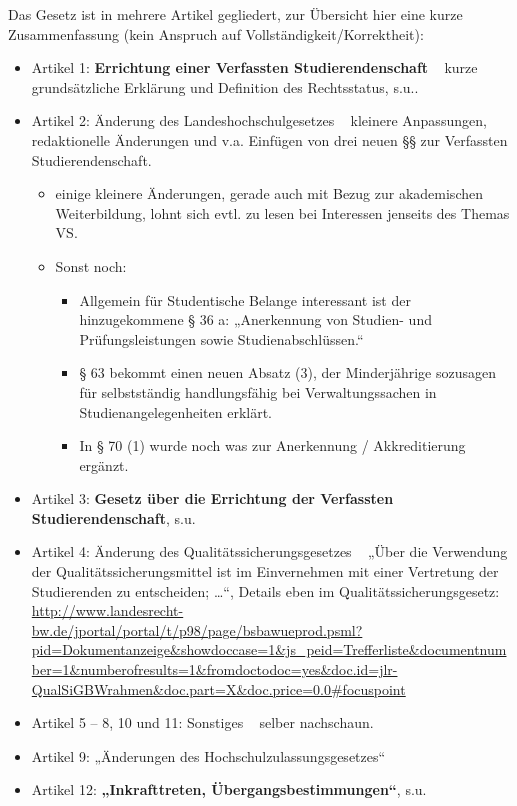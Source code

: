 \documentclass[
10pt,
a4paper,
twoside,								%
titlepage=false,							%
draft=false								%
]{scrartcl}
\begin{document}
Das Gesetz ist in mehrere Artikel gegliedert, zur Übersicht hier eine kurze Zusammenfassung (kein Anspruch auf Vollständigkeit/Korrektheit):

\begin{itemize}
	\item Artikel 1: \textbf{Errichtung einer Verfassten Studierendenschaft} \textrightarrow~ kurze grundsätzliche Erklärung und Definition des Rechtsstatus, s.u..
	\item Artikel 2: Änderung des Landeshochschulgesetzes \textrightarrow~ kleinere Anpassungen, redaktionelle Änderungen und v.a. Einfügen von drei neuen §§ zur Verfassten Studierendenschaft.
	\begin{itemize}
		\item einige kleinere Änderungen, gerade auch mit Bezug zur akademischen Weiterbildung, lohnt sich evtl. zu lesen bei Interessen jenseits des Themas VS.
		\item Sonst noch:
		\begin{itemize}
			\item Allgemein für Studentische Belange interessant ist der hinzugekommene § 36 a: „Anerkennung von Studien- und Prüfungsleistungen sowie Studienabschlüssen.“
			\item § 63 bekommt einen neuen Absatz (3), der Minderjährige sozusagen für selbstständig handlungsfähig bei Verwaltungssachen in Studienangelegenheiten erklärt.
			\item In § 70 (1) wurde noch was zur Anerkennung / Akkreditierung ergänzt.
		\end{itemize}
	\end{itemize}
	\item Artikel 3: \textbf{Gesetz über die Errichtung der Verfassten Studierendenschaft}, s.u.
	\item Artikel 4: Änderung des Qualitätssicherungsgesetzes \textrightarrow~ „Über die Verwendung der Qualitätssicherungsmittel ist im Einvernehmen mit einer Vertretung der Studierenden zu entscheiden; …“, Details eben im Qualitätssicherungsgesetz: \sloppy \url{http://www.landesrecht-bw.de/jportal/portal/t/p98/page/bsbawueprod.psml?pid=Dokumentanzeige&showdoccase=1&js_peid=Trefferliste&documentnumber=1&numberofresults=1&fromdoctodoc=yes&doc.id=jlr-QualSiGBWrahmen&doc.part=X&doc.price=0.0#focuspoint}
	\item Artikel 5 – 8, 10 und 11: Sonstiges \textrightarrow~ selber nachschaun.
	\item Artikel 9: „Änderungen des Hochschulzulassungsgesetzes“
	\item Artikel 12: \textbf{„Inkrafttreten, Übergangsbestimmungen“}, s.u.
\end{itemize}
\end{document}
